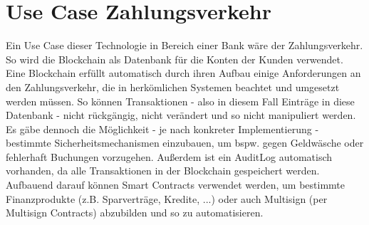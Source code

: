 \noindent

\section{Use Case Zahlungsverkehr}



Ein Use Case dieser Technologie in Bereich einer Bank wäre der Zahlungsverkehr. 
So wird die Blockchain als Datenbank für die Konten der Kunden verwendet.
Eine Blockchain erfüllt automatisch durch ihren Aufbau einige Anforderungen an den Zahlungsverkehr, die in herkömlichen Systemen beachtet und umgesetzt werden müssen. 
So können Transaktionen - also in diesem Fall Einträge in diese Datenbank - nicht rückgängig, nicht verändert und so nicht manipuliert werden. 
Es gäbe dennoch die Möglichkeit - je nach konkreter Implementierung - bestimmte Sicherheitsmechanismen einzubauen, um bspw. gegen Geldwäsche oder fehlerhaft Buchungen vorzugehen. 
Außerdem ist ein AuditLog automatisch vorhanden, da alle Transaktionen in der Blockchain gespeichert werden.
Aufbauend darauf können Smart Contracts verwendet werden, um bestimmte Finanzprodukte (z.B. Sparverträge, Kredite, ...) oder auch Multisign (per Multisign Contracts) abzubilden und so zu automatisieren. 






